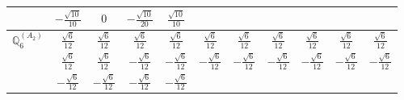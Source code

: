 \documentclass[fleqn,10pt,landscape]{article}
\begin{document}
\begin{itemize}
{\begin{center}
\begin{longtable}{ccccccccccc}
& $ - \frac{\sqrt{10}}{10} $ & $ 0 $ & $ - \frac{\sqrt{10}}{20} $ & $ \frac{\sqrt{10}}{10} $ & $  $ & $  $ & $  $ & $  $ & $  $ & $  $ \\ \hline
$\mathbb{Q}_{6}^{(A_{2})}$ & $ \frac{\sqrt{6}}{12} $ & $ \frac{\sqrt{6}}{12} $ & $ \frac{\sqrt{6}}{12} $ & $ \frac{\sqrt{6}}{12} $ & $ \frac{\sqrt{6}}{12} $ & $ \frac{\sqrt{6}}{12} $ & $ \frac{\sqrt{6}}{12} $ & $ \frac{\sqrt{6}}{12} $ & $ \frac{\sqrt{6}}{12} $ & $ \frac{\sqrt{6}}{12} $ \\
& $ \frac{\sqrt{6}}{12} $ & $ \frac{\sqrt{6}}{12} $ & $ - \frac{\sqrt{6}}{12} $ & $ - \frac{\sqrt{6}}{12} $ & $ - \frac{\sqrt{6}}{12} $ & $ - \frac{\sqrt{6}}{12} $ & $ - \frac{\sqrt{6}}{12} $ & $ - \frac{\sqrt{6}}{12} $ & $ - \frac{\sqrt{6}}{12} $ & $ - \frac{\sqrt{6}}{12} $ \\
& $ - \frac{\sqrt{6}}{12} $ & $ - \frac{\sqrt{6}}{12} $ & $ - \frac{\sqrt{6}}{12} $ & $ - \frac{\sqrt{6}}{12} $ & $  $ & $  $ & $  $ & $  $ & $  $ & $  $ \\
\end{longtable}
\end{center}
}
\end{itemize}
\end{document}

